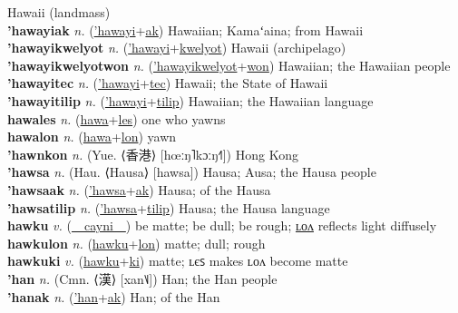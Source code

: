 Hawaii (landmass) \label{'hawayi} \\
\textbf{'hawayiak} \textit{n.} (\hyperref['hawayi]{'hawayi}+\hyperref[ak]{ak})
Hawaiian; Kamaʻaina; from Hawaii \label{'hawayiak} \\
\textbf{'hawayikwelyot} \textit{n.} (\hyperref['hawayi]{'hawayi}+\hyperref[kwelyot]{kwelyot})
Hawaii (archipelago) \label{'hawayikwelyot} \\
\textbf{'hawayikwelyotwon} \textit{n.} (\hyperref['hawayikwelyot]{'hawayikwelyot}+\hyperref[won]{won})
Hawaiian; the Hawaiian people \label{'hawayikwelyotwon} \\
\textbf{'hawayitec} \textit{n.} (\hyperref['hawayi]{'hawayi}+\hyperref[tec]{tec})
Hawaii; the State of Hawaii \label{'hawayitec} \\
\textbf{'hawayitilip} \textit{n.} (\hyperref['hawayi]{'hawayi}+\hyperref[tilip]{tilip})
Hawaiian; the Hawaiian language \label{'hawayitilip} \\
\textbf{hawales} \textit{n.} (\hyperref[hawa]{hawa}+\hyperref[les]{les})
one who yawns \label{hawales} \\
\textbf{hawalon} \textit{n.} (\hyperref[hawa]{hawa}+\hyperref[lon]{lon})
yawn \label{hawalon} \\
\textbf{'hawnkon} \textit{n.} (Yue. ⟨香港⟩ [hœːŋ˥kɔːŋ˧˥])
Hong Kong \label{'hawnkon} \\
\textbf{'hawsa} \textit{n.} (Hau. ⟨Hausa⟩ [hawsa])
Hausa; Ausa; the Hausa people \label{'hawsa} \\
\textbf{'hawsaak} \textit{n.} (\hyperref['hawsa]{'hawsa}+\hyperref[ak]{ak})
Hausa; of the Hausa \label{'hawsaak} \\
\textbf{'hawsatilip} \textit{n.} (\hyperref['hawsa]{'hawsa}+\hyperref[tilip]{tilip})
Hausa; the Hausa language \label{'hawsatilip} \\
\textbf{hawku} \textit{v.} (\hyperref[cayni]{~~cayni~~})
be matte; be dull; be rough; \hyperref[hawkulon]{ʟᴏᴧ} reflects light diffusely \label{hawku} \\
\textbf{hawkulon} \textit{n.} (\hyperref[hawku]{hawku}+\hyperref[lon]{lon})
matte; dull; rough \label{hawkulon} \\
\textbf{hawkuki} \textit{v.} (\hyperref[hawku]{hawku}+\hyperref[ki]{ki})
matte; ʟєꜱ makes ʟᴏᴧ become matte \label{hawkuki} \\
\textbf{'han} \textit{n.} (Cmn. ⟨漢⟩ [xan˥˩])
Han; the Han people \label{'han} \\
\textbf{'hanak} \textit{n.} (\hyperref['han]{'han}+\hyperref[ak]{ak})
Han; of the Han \label{'hanak} \\
